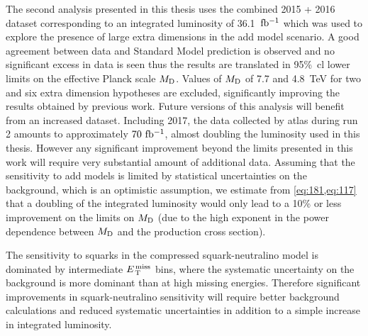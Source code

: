 The second analysis presented in this thesis uses the combined 2015 + 2016
dataset corresponding to an integrated luminosity of 36.1~$\mbox{fb$^{-1}$}$ which was used
to explore the presence of large extra dimensions in the \gls{add} model
scenario. A good agreement between data and Standard Model prediction is
observed and no significant excess in data is seen thus the results are
translated in 95\%~\gls{cl} lower limits on the effective Planck scale
$M_\mathrm{D}$. Values of $M_\mathrm{D}$ of 7.7 and 4.8~TeV for two and six extra dimension
hypotheses are excluded, significantly improving the results obtained by
previous work. Future versions of this analysis will benefit from an increased
dataset. Including 2017, the data collected by \gls{atlas} during run 2 amounts
to approximately $70~\mbox{fb$^{-1}$}$, almost doubling the luminosity used in this thesis.
However any significant improvement beyond the limits presented in this work
will require very substantial amount of additional data. Assuming that the
sensitivity to \gls{add} models is limited by statistical uncertainties on the
background, which is an optimistic assumption, we estimate from
\cref{eq:181,eq:117} that a doubling of the integrated luminosity would only
lead to a 10\% or less improvement on the limits on $M_\mathrm{D}$ (due to the high
exponent in the power dependence between $M_\mathrm{D}$ and the production cross
section).

The sensitivity to squarks in the compressed squark-neutralino model is
dominated by intermediate $E_\mathrm{\, T}^\mathrm{\, miss}$ bins, where the systematic uncertainty on the
background is more dominant than at high missing energies. Therefore significant
improvements in squark-neutralino sensitivity will require better background
calculations and reduced systematic uncertainties in addition to a simple
increase in integrated luminosity.
